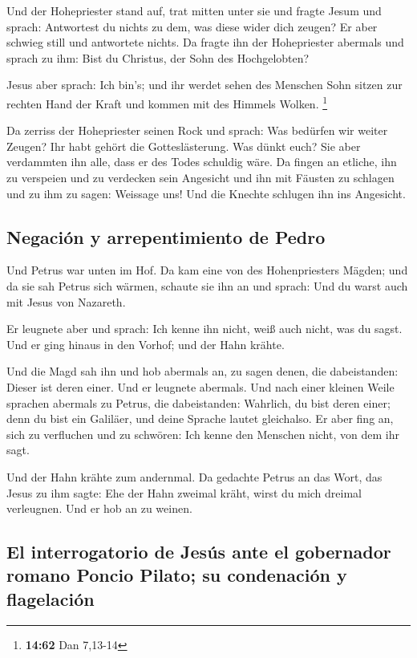  Und der Hohepriester stand auf, trat mitten unter sie
und fragte Jesum und sprach: Antwortest du nichts zu dem, was diese
wider dich zeugen?  Er aber schwieg still und antwortete
nichts. Da fragte ihn der Hohepriester abermals und sprach zu ihm: Bist
du Christus, der Sohn des Hochgelobten?

 Jesus aber sprach: Ich bin's; und ihr werdet sehen des
Menschen Sohn sitzen zur rechten Hand der Kraft und kommen mit des
Himmels Wolken. \footnote{\textbf{14:62} Dan 7,13-14}

 Da zerriss der Hohepriester seinen Rock und sprach: Was
bedürfen wir weiter Zeugen?  Ihr habt gehört die
Gotteslästerung. Was dünkt euch? Sie aber verdammten ihn alle, dass er
des Todes schuldig wäre.  Da fingen an etliche, ihn zu
verspeien und zu verdecken sein Angesicht und ihn mit Fäusten zu
schlagen und zu ihm zu sagen: Weissage uns! Und die Knechte schlugen ihn
ins Angesicht.

\hypertarget{negaciuxf3n-y-arrepentimiento-de-pedro}{%
\subsection{Negación y arrepentimiento de
Pedro}\label{negaciuxf3n-y-arrepentimiento-de-pedro}}

 Und Petrus war unten im Hof. Da kam eine von des
Hohenpriesters Mägden;  und da sie sah Petrus sich
wärmen, schaute sie ihn an und sprach: Und du warst auch mit Jesus von
Nazareth.

 Er leugnete aber und sprach: Ich kenne ihn nicht, weiß
auch nicht, was du sagst. Und er ging hinaus in den Vorhof; und der Hahn
krähte.

 Und die Magd sah ihn und hob abermals an, zu sagen
denen, die dabeistanden: Dieser ist deren einer.  Und er
leugnete abermals. Und nach einer kleinen Weile sprachen abermals zu
Petrus, die dabeistanden: Wahrlich, du bist deren einer; denn du bist
ein Galiläer, und deine Sprache lautet gleichalso.  Er
aber fing an, sich zu verfluchen und zu schwören: Ich kenne den Menschen
nicht, von dem ihr sagt.

 Und der Hahn krähte zum andernmal. Da gedachte Petrus an
das Wort, das Jesus zu ihm sagte: Ehe der Hahn zweimal kräht, wirst du
mich dreimal verleugnen. Und er hob an zu weinen.

\hypertarget{el-interrogatorio-de-jesuxfas-ante-el-gobernador-romano-poncio-pilato-su-condenaciuxf3n-y-flagelaciuxf3n}{%
\subsection{El interrogatorio de Jesús ante el gobernador romano Poncio
Pilato; su condenación y
flagelación}\label{el-interrogatorio-de-jesuxfas-ante-el-gobernador-romano-poncio-pilato-su-condenaciuxf3n-y-flagelaciuxf3n}}

